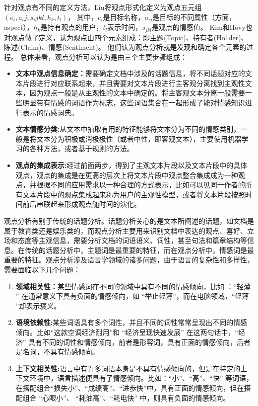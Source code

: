 针对观点有不同的定义方法，Liu将观点形式化定义为观点五元组$ (e_i,a_ij,s_ijkl,h_k,t_l)$，
其中，$ e_i $是目标名称，$ a_{ij} $是目标的不同属性（方面，aspect），$ h_k$是持有观点的用户，$ t_l$表示时间，$ s_{jkl}$是观点的情感值。
Kim和Hovy也对观点做了定义，认为观点由四个元素组成：即主题(Topic)、持有者(Ho1der)、陈述(Claim)、情感(Sentiment)。
他们认为观点分析就是发现和确定各个元素的过程。
总体来看，观点分析可以认为是由三个主要步骤组成：
\begin{itemize}
\item \textbf{文本中观点信息确定：}需要确定文档中涉及的话题信息，将不同话题对应的文本片段进行对应联系起来，并且需要对文本片段进行主客观分离找到主观性文本，因为观点一般是从主观性的文本中确定的。将主客观文本分离一般需要一些明显带有情感的词语作为标志，这些词语集合在一起形成了能对情感知识进行表示的情感词典。
\item \textbf{文本情感分类:}从文本中抽取有用的特征能够将文本分为不同的情感类别，一般是将文本分为积极或消极极性（或者中性，即客观文本），主要使用机器学习的各种方法，或者基于规则的方法。
\item \textbf{观点的集成表示:}经过前面两步，得到了主观文本片段以及文本片段中的具体观点，观点的集成是在更高的层次上将文本片段中观点整合集成成为一种观点，并根据不同的应用需求以一种合理的方式表示，比如可以见同一作者的所有文本片段中的观点集成起来称为用户的主观性模型，或者将文本片段按照时间前后串联起来形成观点随时间的演化。
\end{itemize}

观点分析有别于传统的话题分析。话题分析关心的是文本所阐述的话题，如文档是属于教育类还是娱乐类的，而观点分析主要用来识别文档中表达的观点、喜好、立场和态度等主观信息，需要分析文档的词语语义、词性，甚至句法和篇章结构等信息。在传统的话题分析中，主题词是最重要的特征，而在观点分析中，情感词是最重要的特征。观点分析涉及语言学领域的诸多问题，由于语言的复杂性和多样性，需要面临以下几个问题：

\begin{enumerate}
\item \textbf{领域相关性：}某些情感词在不同的领域中具有不同的情感倾向，比如 ：``轻薄 '' 在通常意义下具有负面的情感倾向，如 ``举止轻薄''，而在电脑领域，``轻薄 ''却表示褒义。
\item \textbf{语境依赖性:}某些词语具有多个词性，并且不同的词性常常呈现出不同的情感倾向。比如``这款空调经济耐用''和 ``经济呈现快速发展'' 在这两句话中，``经济'' 具有不同的词性和情感倾向，前者是形容词，具有正面的情感倾向，后者是名词，不具有情感倾向。
\item \textbf{上下文相关性:}语言中有许多词语本身是不具有情感倾向的，但是在特定的上下文环境中，语言描述便具有了情感倾向。比如：``小''、``高''、``快'' 等词语，在搭配组合``损失小''、``成绩高''、``进歩快''中，具有正面的情感倾向，但在搭配组合 ``心眼小''、 ``耗油高''、``耗电快'' 中，则具有负面的情感倾向。
\end{enumerate}

